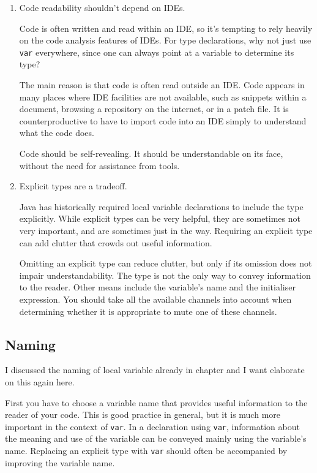 \begin{enumerate}[label=P\arabic*.]
\item{Code readability shouldn’t depend on IDEs.

Code is often written and read within an IDE, so it’s tempting to rely heavily on the code analysis features of IDEs. For type declarations, why not just use \lstinline|var| everywhere, since one can always point at a variable to determine its type?

The main reason is that code is often read outside an IDE. Code appears in many places where IDE facilities are not available, such as snippets within a document, browsing a repository on the internet, or in a patch file. It is counterproductive to have to import code into an IDE simply to understand what the code does.

Code should be self-revealing. It should be understandable on its face, without the need for assistance from tools.}

\item{Explicit types are a tradeoff.

Java has historically required local variable declarations to include the type explicitly. While explicit types can be very helpful, they are sometimes not very important, and are sometimes just in the way. Requiring an explicit type can add clutter that crowds out useful information.

Omitting an explicit type can reduce clutter, but only if its omission does not impair understandability. The type is not the only way to convey information to the reader. Other means include the variable's name and the initialiser expression. You should take all the available channels into account when determining whether it is appropriate to mute one of these channels.}
\end{enumerate}


\subsection{Naming}
I discussed the naming of local variable already in chapter  and I want elaborate on this again here.

First you have to choose a variable name that provides useful information to the reader of your code. This is good practice in general, but it is much more important in the context of \lstinline|var|. In a declaration using \lstinline|var|, information about the meaning and use of the variable can be conveyed mainly using the variable's name. Replacing an explicit type with \lstinline|var| should often be accompanied by improving the variable name.

